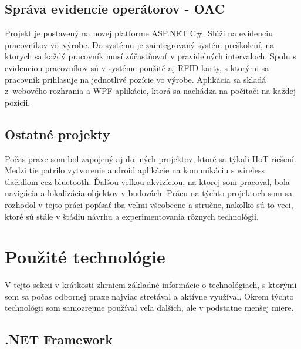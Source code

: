 \documentclass[11pt, oneside]{report}
\begin{document}
\section{Správa evidencie operátorov - OAC}
Projekt je postavený na novej platforme ASP.NET C\#. Slúži na evidenciu  pracovníkov vo~výrobe. Do systému je zaintegrovaný systém preškolení, na ktorych sa každý pracovník musí zúčastňovať v pravidelných intervaloch. Spolu s evidenciou pracovníkov sú v systéme použité aj RFID karty, s ktorými sa pracovník prihlasuje na jednotlivé pozície vo výrobe. Aplikácia sa skladá z~webového rozhrania a  WPF aplikácie, ktorá sa nachádza na počitači na každej pozícii.

\section{Ostatné projekty}
Počas praxe som bol zapojený aj do iných projektov, ktoré sa týkali IIoT riešení. Medzi tie patrilo vytvorenie android aplikácie na komunikáciu s wireless tlačidlom cez bluetooth. Ďalšou veľkou akvizíciou, na ktorej som pracoval, bola navigácia a lokalizácia objektov v budovách. Prácu na týchto projektoch som sa rozhodol v tejto práci popísať iba veľmi všeobecne a stručne, nakoľko sú to veci, ktoré sú stále v štádiu návrhu a experimentovania rôznych technológii.

\chapter{Použité technológie}
V tejto sekcii v krátkosti zhrniem základné informácie o technológiach, s ktorými som sa počas odbornej praxe najviac stretával a aktívne využíval. Okrem týchto  technológii som samozrejme používal veľa ďalších, ale v podstatne menšej miere.

\section{.NET Framework}
\end{document}
